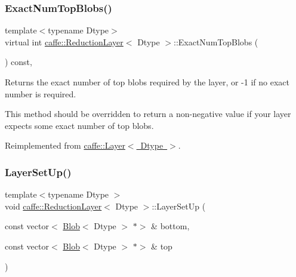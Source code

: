 \subsubsection{\texorpdfstring{Exact\+Num\+Top\+Blobs()}{ExactNumTopBlobs()}\hspace{0.1cm}{\footnotesize\ttfamily [2/2]}}
{\footnotesize\ttfamily template$<$typename Dtype$>$ \\
virtual int \mbox{\hyperlink{classcaffe_1_1_reduction_layer}{caffe\+::\+Reduction\+Layer}}$<$ Dtype $>$\+::Exact\+Num\+Top\+Blobs (\begin{DoxyParamCaption}{ }\end{DoxyParamCaption}) const\hspace{0.3cm}{\ttfamily [inline]}, {\ttfamily [virtual]}}



Returns the exact number of top blobs required by the layer, or -\/1 if no exact number is required. 

This method should be overridden to return a non-\/negative value if your layer expects some exact number of top blobs. 

Reimplemented from \mbox{\hyperlink{classcaffe_1_1_layer_a64e2ca72c719e4b2f1f9216ccfb0d37f}{caffe\+::\+Layer$<$ Dtype $>$}}.

\mbox{\label{classcaffe_1_1_reduction_layer_aafe0aa825e019ea35225a8e493e4e919}} 
\subsubsection{\texorpdfstring{Layer\+Set\+Up()}{LayerSetUp()}\hspace{0.1cm}{\footnotesize\ttfamily [1/2]}}
{\footnotesize\ttfamily template$<$typename Dtype $>$ \\
void \mbox{\hyperlink{classcaffe_1_1_reduction_layer}{caffe\+::\+Reduction\+Layer}}$<$ Dtype $>$\+::Layer\+Set\+Up (\begin{DoxyParamCaption}\item[{const vector$<$ \mbox{\hyperlink{classcaffe_1_1_blob}{Blob}}$<$ Dtype $>$ $\ast$$>$ \&}]{bottom,  }\item[{const vector$<$ \mbox{\hyperlink{classcaffe_1_1_blob}{Blob}}$<$ Dtype $>$ $\ast$$>$ \&}]{top }\end{DoxyParamCaption})\hspace{0.3cm}{\ttfamily [virtual]}}



